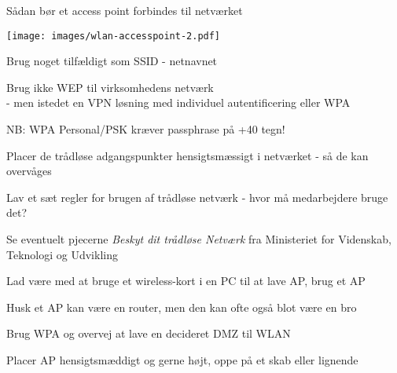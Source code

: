 \centerline{\hlkbig Sådan bør et access point forbindes til netværket}



\begin{minipage}{10cm}
\texttt{[image: images/wlan-accesspoint-2.pdf]}
\end{minipage}
\begin{minipage}{\linewidth-10cm}
\begin{list2}
\item Brug noget tilfældigt som SSID - netnavnet
\item Brug ikke WEP til virksomhedens netværk\\
- men istedet en VPN løsning med individuel
  autentificering eller WPA
\item NB: WPA Personal/PSK kræver passphrase på +40 tegn!
\item Placer de trådløse adgangspunkter hensigtsmæssigt i netværket -
  så de kan overvåges
\item Lav et sæt regler for brugen af trådløse netværk - hvor må 
  medarbejdere bruge det?
\item Se eventuelt pjecerne \emph{Beskyt dit trådløse Netværk} fra
Ministeriet for Videnskab, Teknologi og Udvikling \\
\end{list2}
\end{minipage} 



\begin{list1}
\item Lad være med at bruge et wireless-kort i en PC til at lave AP, brug et AP
\item Husk et AP kan være en router, men den kan ofte også blot være en bro
\item Brug WPA og overvej at lave en decideret DMZ til WLAN
\item Placer AP hensigtsmæddigt og gerne højt, oppe på et skab eller lignende
\end{list1}


